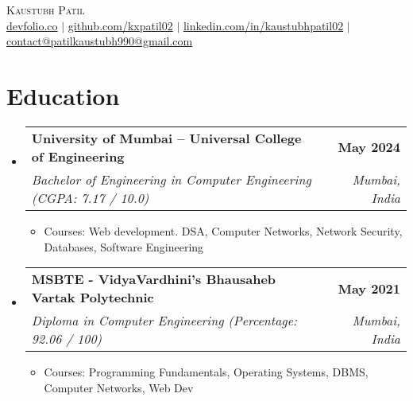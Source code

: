 \documentclass[letterpaper,11pt]{article}
\makeatletter
\newcommand{\resumeItem}[1]{
  \item\small{
    {#1 \vspace{-2pt}}
  }
}
\newcommand{\resumeSubheading}[4]{
  \vspace{-2pt}\item
    \begin{tabular*}{1.0\textwidth}[t]{l@{\extracolsep{\fill}}r}
      \vspace{-2pt}\textbf{#1} & \textbf{\small #2} \\
      \textit{\small#3} & \textit{\small #4} \\
    \end{tabular*}\vspace{-7pt}
}
\newcommand{\resumeSubHeadingListStart}{\begin{itemize}[leftmargin=0.0in, label={}]}
\newcommand{\resumeSubHeadingListEnd}{\end{itemize}}
\newcommand{\resumeItemListStart}{\begin{itemize}}
\newcommand{\resumeItemListEnd}{\end{itemize}\vspace{-5pt}}
\makeatother
\begin{document}

\begin{center}
    {\huge \scshape Kaustubh Patil} \\ \vspace{5pt}
    \small
    \href{https://devfolio.co/@kxpatil02}{devfolio.co} $|$ \href{https://github.com/kxpatil02}{github.com/kxpatil02} $|$ \href{https://www.linkedin.com/in/kaustubhpatil02/}{linkedin.com/in/kaustubhpatil02} $|$ \href{mailto:contact@patilkaustubh990@gmail.com}{contact@patilkaustubh990@gmail.com}
    \vspace{-8pt}
\end{center}


\section{Education}
    \resumeSubHeadingListStart
        \resumeSubheading
            {University of Mumbai --  Universal College of Engineering}{May 2024}
            {Bachelor of Engineering in Computer Engineering  (CGPA: 7.17  / 10.0)}{Mumbai, India}
            \resumeItemListStart
                \resumeItem{Courses:  Web development. DSA, Computer Networks, Network Security, Databases, Software Engineering}
            \resumeItemListEnd

        \resumeSubheading
            {MSBTE - VidyaVardhini’s Bhausaheb Vartak Polytechnic}{May 2021}
            {Diploma in Computer Engineering (Percentage: 92.06 / 100)}{Mumbai, India}
            \resumeItemListStart
                \resumeItem{Courses:  Programming Fundamentals, Operating Systems, DBMS, Computer Networks, Web Dev
                }
            \resumeItemListEnd
    \resumeSubHeadingListEnd
\vspace{-19pt}


\end{document}
